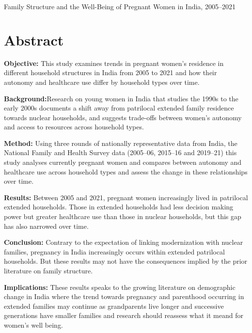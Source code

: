 \documentclass[12pt]{article}
\begin{document}
\doublespacing
\RaggedRight
{}
\setlength{\parskip}{0ex}

\thispagestyle{plain}
\begin{center}
Family Structure and the Well-Being of Pregnant Women in India, 2005--2021
\end{center}
\newpage



\section*{Abstract}

\noindent\textbf{Objective:} This study examines trends in pregnant women's residence in different household structures in India from 2005 to 2021 and how their autonomy and healthcare use differ by household types over time. 

\medskip
\noindent\textbf{Background:}Research on young women in India that studies the 1990s to the early 2000s documents a shift away from patrilocal extended family residence towards nuclear households, and suggests trade-offs between women’s autonomy and access to resources across household types.

\medskip
\noindent\textbf{Method:} Using three rounds of nationally representative data from India, the National Family and Health Survey data (2005--06, 2015--16 and 2019--21) this study analyses currently pregnant women and compares between autonomy and healthcare use across household types and assess the change in these relationships over time.  

\medskip
\noindent\textbf{Results:} Between 2005 and 2021, pregnant women increasingly lived in patrilocal extended households. Those in extended households had less decision making power but greater healthcare use than those in nuclear households, but this gap has also narrowed over time.

\medskip
\noindent\textbf{Conclusion:} Contrary to the expectation of linking modernization with nuclear families, pregnancy in India increasingly occurs within extended patrilocal households. But these results may not have the consequences implied by the prior literature on family structure.

\medskip
\noindent\textbf{Implications:} These results speaks to the growing literature on demographic change in India where the trend towards pregnancy and parenthood occurring in extended families may continue as grandparents live longer and successive generations have smaller families and research should reassess what it meand for women's well being. 
\end{document}
